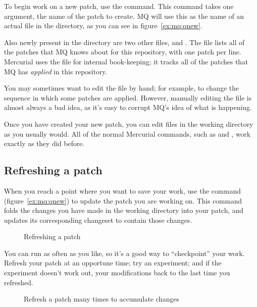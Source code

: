 To begin work on a new patch, use the  command.  This
command takes one argument, the name of the patch to create.  MQ will
use this as the name of an actual file in the 
directory, as you can see in figure~\ref{ex:mq:qnew}.

Also newly present in the  directory are two
other files,  and .  The
 file lists all of the patches that MQ knows about
for this repository, with one patch per line.  Mercurial uses the
 file for internal book-keeping; it tracks all of the
patches that MQ has \emph{applied} in this repository.

\begin{note}
  You may sometimes want to edit the  file by hand;
  for example, to change the sequence in which some patches are
  applied.  However, manually editing the  file is
  almost always a bad idea, as it's easy to corrupt MQ's idea of what
  is happening.
\end{note}

Once you have created your new patch, you can edit files in the
working directory as you usually would.  All of the normal Mercurial
commands, such as  and , work exactly as
they did before.

\subsection{Refreshing a patch}

When you reach a point where you want to save your work, use the
 command (figure~\ref{ex:mq:qnew}) to update the patch
you are working on.  This command folds the changes you have made in
the working directory into your patch, and updates its corresponding
changeset to contain those changes.

\begin{figure}[ht]
  \caption{Refreshing a patch}
  \label{ex:mq:qrefresh}
\end{figure}

You can run  as often as you like, so it's a good way
to ``checkpoint'' your work.  Refresh your patch at an opportune
time; try an experiment; and if the experiment doesn't work out,
 your modifications back to the last time you refreshed.

\begin{figure}[ht]
  \caption{Refresh a patch many times to accumulate changes}
  \label{ex:mq:qrefresh2}
\end{figure}

